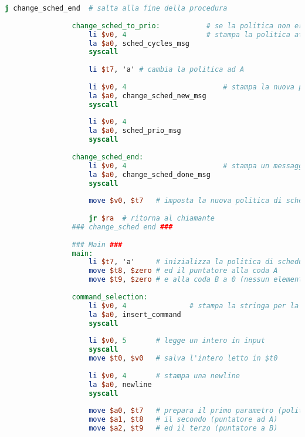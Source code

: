 \begin{center}
\begin{lstlisting}[language=mips, gobble=14, stepnumber=1]
                    j change_sched_end  # salta alla fine della procedura
                    
                change_sched_to_prio:           # se la politica non era A
                    li $v0, 4                   # stampa la politica attuale (su ESECUZIONI RIMANENTI)
                    la $a0, sched_cycles_msg
                    syscall
                
                    li $t7, 'a' # cambia la politica ad A
                    
                    li $v0, 4                       # stampa la nuova politica (su PRIORITA)
                    la $a0, change_sched_new_msg
                    syscall
                    
                    li $v0, 4
                    la $a0, sched_prio_msg
                    syscall
                    
                change_sched_end:
                    li $v0, 4                       # stampa un messaggio di corretta terminazione della procedura
                    la $a0, change_sched_done_msg
                    syscall
                    
                    move $v0, $t7   # imposta la nuova politica di scheduling come valore di ritorno
                    
                    jr $ra  # ritorna al chiamante
                ### change_sched end ###
                
                ### Main ###
                main:
                    li $t7, 'a'     # inizializza la politica di scheduling ad A (scheduling su priorità)
                    move $t8, $zero # ed il puntatore alla coda A
                    move $t9, $zero # e alla coda B a 0 (nessun elemento in coda)
                
                command_selection:
                    li $v0, 4               # stampa la stringa per la selezione del comando
                    la $a0, insert_command
                    syscall
                    
                    li $v0, 5       # legge un intero in input
                    syscall
                    move $t0, $v0   # salva l'intero letto in $t0
                    
                    li $v0, 4       # stampa una newline
                    la $a0, newline
                    syscall
                    
                    move $a0, $t7   # prepara il primo parametro (politica di scheduling)
                    move $a1, $t8   # il secondo (puntatore ad A)
                    move $a2, $t9   # ed il terzo (puntatore a B)
                    

\end{lstlisting}
\end{center}
